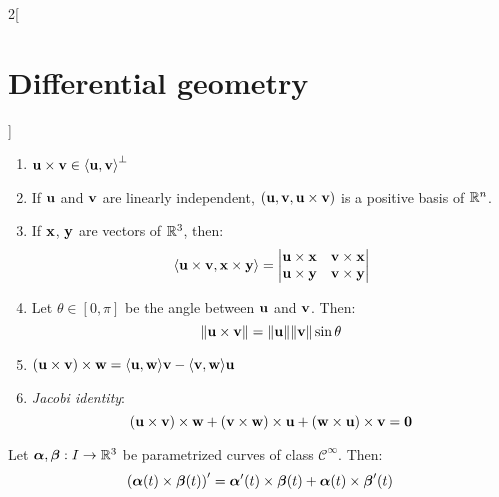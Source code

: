 \documentclass[../../../main.tex]{subfiles}
\begin{document}
\begin{multicols}{2}[\section{Differential geometry}]
\begin{proposition}
\begin{enumerate}
      \item $\vf{u}\times\vf{v}\in{\langle\vf{u},\vf{v}\rangle}^{\perp}$
      \item If $\vf{u}$ and $\vf{v}$ are linearly independent, $(\vf{u},\vf{v},\vf{u}\times\vf{v})$ is a positive basis of $\RR^n$.
      \item If $\vf{x}$, $\vf{y}$ are vectors of $\RR^3$, then: $$\langle\vf{u}\times\vf{v},\vf{x}\times\vf{y}\rangle=
              \begin{vmatrix}
                \vf{u}\times\vf{x} & \vf{v}\times\vf{x} \\
                \vf{u}\times\vf{y} & \vf{v}\times\vf{y} \\
              \end{vmatrix}$$
      \item Let $\theta\in[0,\pi]$ be the angle between $\vf{u}$ and $\vf{v}$. Then: $$\|\vf{u}\times\vf{v}\|=\|\vf{u}\|\|\vf{v}\|\sin\theta$$
      \item $(\vf{u}\times\vf{v})\times\vf{w}=\langle\vf{u},\vf{w}\rangle\vf{v}-\langle\vf{v},\vf{w}\rangle\vf{u}$
      \item \emph{Jacobi identity}: $$(\vf{u}\times\vf{v})\times\vf{w}+(\vf{v}\times\vf{w})\times\vf{u}+(\vf{w}\times\vf{u})\times\vf{v}=\vf{0}$$
    \end{enumerate}
  \end{proposition}
  \begin{proposition}
    Let $\vf{\alpha},\vf{\beta}:I\rightarrow\RR^3$ be parametrized curves of class $\mathcal{C}^\infty$. Then:
    $${\left(\vf{\alpha}(t)\times\vf{\beta}(t)\right)}'=\vf{\alpha}'(t)\times\vf{\beta}(t)+\vf{\alpha}(t)\times\vf{\beta}'(t)$$
  \end{proposition}

\end{multicols}
\end{document}
